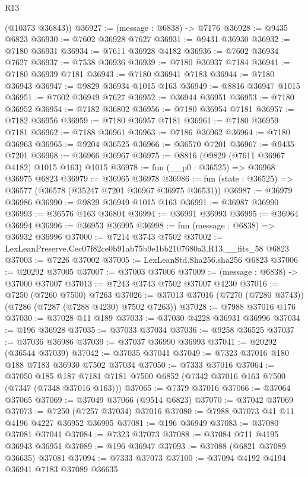 \begin{lexlean}{R13}
\begin{coremodule}
      (@10373 @36843))
@36927 := (message : @6838) -> @7176
@36928 := @9435 @6823
@36930 := @7602 @36928 @7627
@36931 := @9431 @36930
@36932 := @7180 @36931
@36934 := @7611 @36928 @4182
@36936 := @7602 @36934 @7627
@36937 := @7538 @36936
@36939 := @7180 @36937 @7184
@36941 := @7180 @36939 @7181
@36943 := @7180 @36941 @7183
@36944 := @7180 @36943
@36947 := @9829 @36934 @1015 @163
@36949 := @8816 @36947 @1015
@36951 := @7602 @36949 @7627
@36952 := @36944 @36951
@36953 := @7180 @36952
@36954 := @7182 @36802
@36956 := @7180 @36954 @7181
@36957 := @7182 @36956
@36959 := @7180 @36957 @7181
@36961 := @7180 @36959 @7181
@36962 := @7188 @36961
@36963 := @7186 @36962
@36964 := @7180 @36963
@36965 := @9204 @36525
@36966 := @36570 @7201
@36967 := @9435 @7201
@36968 := @36966 @36967
@36975 := @8816 (@9829 (@7611 @36967 @4182) @1015 @163) @1015
@36978 := fun (__p0 : @36525) => @36968 @36975 @6823
@36979 := @36965 @36978
@36986 := fun (state : @36525) => @36577 (@36578 (@35247 @7201 @36967 @36975 @36531))
@36987 := @36979 @36986
@36990 := @9829 @36949 @1015 @163
@36991 := @36987 @36990
@36993 := @36576 @163 @36804
@36994 := @36991 @36993
@36995 := @36964 @36994
@36996 := @36953 @36995
@36998 := fun (message : @6838) => @36932 @36996
@37000 := @7214 @3743 @7502
@37002 := LexLeanPreserve.Cec07f82ce0b91ab75b9e1bb2107680a3.R13.__fits_58 @6823
@37003 := @7226 @37002
@37005 := LexLeanStd.Sha256.sha256 @6823
@37006 := @20292 @37005
@37007 := @37003 @37006
@37009 := (message : @6838) -> @37000 @37007
@37013 := @7243 @3743 @7502 @37007 @4230
@37016 := @7250 (@7260 @7500) @7263
@37026 := @37013 @37016 (@7270 (@7280 @3743)) (@7286 (@7287 (@7288 @4230) @7502 @7263))
@37028 := @7988 @37016 @176
@37030 := @37028 @11 @189
@37033 := @37030 @4228 @36931 @36996
@37034 := @196 @36928
@37035 := @37033 @37034
@37036 := @9258 @36525
@37037 := @37036 @36986
@37039 := @37037 @36990 @36993
@37041 := @20292 (@36544 @37039)
@37042 := @37035 @37041
@37049 := @7323 @37016 @180 @188 @7183 @36930 @7502 @37034
@37050 := @7333 @37016
@37064 := @37050
    @185
    @187
    @7181
    @7181
    @7500
    @6852
    (@7342 @37016 @163 @7500 (@7347 (@7348 @37016 @163)))
@37065 := @7379 @37016
@37066 := @37064 @37065
@37069 := @37049 @37066 (@9514 @6823)
@37070 := @37042 @37069
@37073 := @7250 (@7257 @37034) @37016
@37080 := @7988 @37073 @41 @11 @4196 @4227 @36952 @36995
@37081 := @196 @36949
@37083 := @37080 @37081 @37041
@37084 := @7323 @37073
@37088 := @37084 @711 @4195 @36943 @36951
@37089 := @196 @36947
@37093 := @37088 (@6821 @37089 @36635) @37081
@37094 := @7333 @37073
@37100 := @37094 @4192 @4194 @36941 @7183 @37089 @36635

\end{coremodule}
\end{lexlean}
